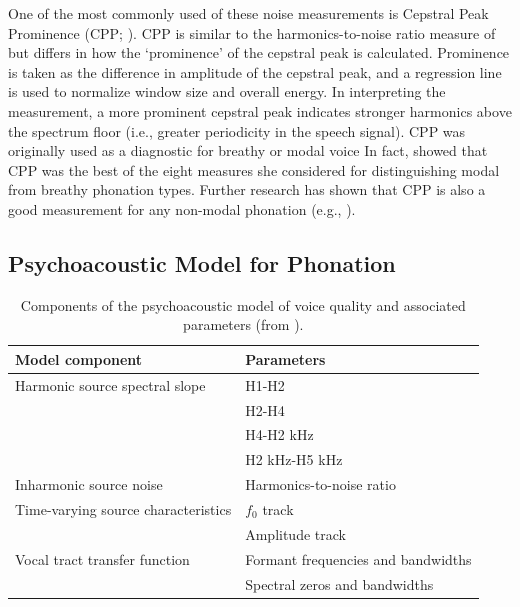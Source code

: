 \documentclass[12pt, letterpaper]{article}
\providecommand{\lsptoprule}{\midrule\toprule}
\providecommand{\lspbottomrule}{\bottomrule\midrule}
\begin{document}
One of the most commonly used of these noise measurements is Cepstral Peak Prominence (CPP; \cite{hillenbrandAcousticCorrelatesBreathy1994,hillenbrandAcousticCorrelatesBreathy1996}). CPP is similar to the harmonics-to-noise ratio measure of \citet{dekromCepstrumBasedTechniqueDetermining1993} but differs in how the ‘prominence’ of the cepstral peak is calculated. Prominence is taken as the difference in amplitude of the cepstral peak, and a regression line is used to normalize window size and overall energy. In interpreting the measurement, a more prominent cepstral peak indicates stronger harmonics above the spectrum floor (i.e., greater periodicity in the speech signal). CPP was originally used as a diagnostic for breathy or modal voice \citep{blankenshipTimingNonmodalPhonation2002,espositoVariationContrastivePhonation2010} In fact, \citeauthor{espositoEffectsLinguisticExperience2010} showed that CPP was the best of the eight measures she considered for distinguishing modal from breathy phonation types. Further research has shown that CPP is also a good measurement for any non-modal phonation (e.g., \cite{andruskiPhonationTypesProduction2000,andruskiToneClarityMixed2006,blankenshipTimingNonmodalPhonation2002,waylandAcousticCorrelatesBreathy2003,avelinoAcousticElectroglottographicAnalyses2010}). 

\subsection{Psychoacoustic Model for Phonation} \label{sec:Background}

\begin{table}[!h]
    \centering
    \caption{Components of the psychoacoustic model of voice quality and associated parameters (from \cite{kreimanUnifiedTheoryVoice2014}).}
    \label{tab:Kreiman}
    \begin{tabular}{ll}
    \lsptoprule
    Model component & Parameters \\
    \hline
    Harmonic source spectral slope      & H1-H2 \\
                                        & H2-H4 \\
	                                & H4-H2 kHz \\
	                                & H2 kHz-H5 kHz \\
    Inharmonic source noise             & Harmonics-to-noise ratio \\
    Time-varying source characteristics & $f_0$ track \\
	                                & Amplitude track \\
    Vocal tract transfer function       & Formant frequencies and bandwidths \\
	                                & Spectral zeros and bandwidths\\
    \lspbottomrule
    \end{tabular}
\end{table}
\end{document}
